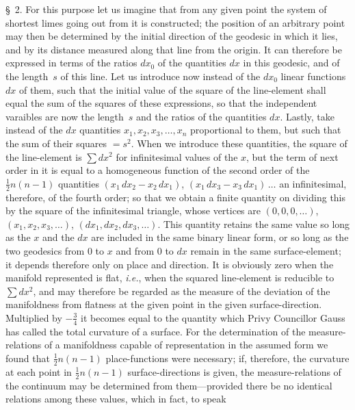 \documentclass[a4paper,12pt]{article}
\begin{document}
\bigbreak

\S~2.
For this purpose let us imagine that from any given point the
system of shortest limes going out from it is constructed; the
position of an arbitrary point may then be determined by the
initial direction of the geodesic in which it lies, and by its
distance measured along that line from the origin.  It can
therefore be expressed in terms of the ratios $dx_0$ of the
quantities $dx$ in this geodesic, and of the length~$s$ of this
line.  Let us introduce now instead of the $dx_0$ linear
functions $dx$ of them, such that the initial value of the square
of the line-element shall equal the sum of the squares of these
expressions, so that the independent varaibles are now the
length~$s$ and the ratios of the quantities $dx$.  Lastly, take
instead of the $dx$ quantities
$x_1, x_2, x_3,\ldots, x_n$ proportional to them, but such that
the sum of their squares $= s^2$.  When we introduce these
quantities, the square of the line-element is $\sum dx^2$ for
infinitesimal values of the $x$, but the term of next order in it
is equal to a homogeneous function of the second order of the
$\frac{1}{2} n (n - 1)$ quantities
$(x_1 \, dx_2 - x_2 \, dx_1)$,
$(x_1 \, dx_3 - x_3 \, dx_1) \, \ldots$
an infinitesimal, therefore, of the fourth order; so that we
obtain a finite quantity on dividing this by the square of the
infinitesimal triangle, whose vertices are
$(0,0,0,\ldots)$, $(x_1, x_2, x_3,\ldots)$,
$(dx_1, dx_2, dx_3,\ldots)$.
This quantity retains the same value so long as the $x$ and the
$dx$ are included in the same binary linear form, or so long as
the two geodesics from $0$ to $x$ and from $0$ to $dx$ remain in
the same surface-element; it depends therefore only on place and
direction.  It is obviously zero when the manifold represented is
flat, \emph{i.e.}, when the squared line-element is reducible to
$\sum dx^2$, and may therefore be regarded as the measure of the
deviation of the manifoldness from flatness at the given point in
the given surface-direction.  Multiplied by $-\frac{3}{4}$ it
becomes equal to the quantity which Privy Councillor Gauss has
called the total curvature of a surface.  For the determination
of the measure-relations of a manifoldness capable of
representation in the assumed form we found that
$\frac{1}{2} n (n - 1)$ place-functions were necessary; if,
therefore, the curvature at each point in $\frac{1}{2} n (n - 1)$
surface-directions is given, the measure-relations of the
continuum may be determined from them---provided there be no
identical relations among these values, which in fact, to speak
\end{document}
